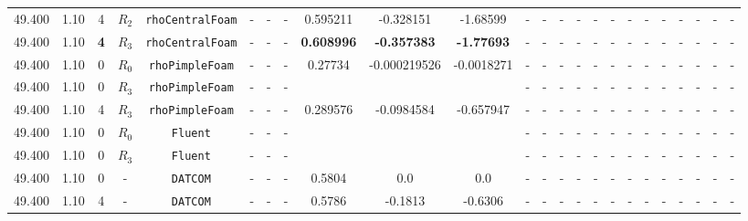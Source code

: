 \documentclass[12pt]{article}
\begin{document}
\begin{table}[H]
{\begin{tabular}{ccccc|ccc|ccc|ccc|ccc|ccccccc}
        \rowcolor{green!30}
        49.400 & 1.10 & 4 & $R_2$ & \texttt{rhoCentralFoam} & - & - & - & 0.595211 & -0.328151 & -1.68599 & - & - & - & - & - & - & - & - & - & - & - & - & - \\
        \rowcolor{green!40}
        49.400 & 1.10 & \cellcolor{lime}\textbf{4} & \cellcolor{cyan}$R_3$ & \texttt{rhoCentralFoam} & - & - & - & \textbf{0.608996} & \textbf{-0.357383} & \textbf{-1.77693} & - & - & - & - & - & - & - & - & - & - & - & - & - \\
        \rowcolor{blue!10}
        49.400 & 1.10 & 0 & $R_0$ & \texttt{rhoPimpleFoam} & - & - & - & 0.27734 & -0.000219526 & -0.0018271 & - & - & - & - & - & - & - & - & - & - & - & - & - \\ 
        \rowcolor{blue!40}
        49.400 & 1.10 & 0 & $R_3$ & \texttt{rhoPimpleFoam} & - & - & - &  & &  & - & - & - & - & - & - & - & - & - & - & - & - & - \\
        \rowcolor{blue!40}
        49.400 & 1.10 & 4 & $R_3$ & \texttt{rhoPimpleFoam} & - & - & - & 0.289576 & -0.0984584 & -0.657947 & - & - & - & - & - & - & - & - & - & - & - & - & - \\
        \rowcolor{red!10}
        49.400 & 1.10 & 0 & $R_0$ & \texttt{Fluent} & - & - & - &  &  &  & - & - & - & - & - & - & - & - & - & - & - & - & - \\ 
        \rowcolor{red!40}
        49.400 & 1.10 & 0 & $R_3$ & \texttt{Fluent} & - & - & - &  &  &  & - & - & - & - & - & - & - & - & - & - & - & - & - \\ 
        \rowcolor{gray!10}
        49.400 & 1.10 & 0 & - & \texttt{DATCOM} & - & - & - & 0.5804 & 0.0 & 0.0 & - & - & - & - & - & - & - & - & - & - & - & - & - \\ 
        \rowcolor{gray!10}
        49.400 & 1.10 & 4 & - & \texttt{DATCOM} & - & - & - & 0.5786 & -0.1813 & -0.6306 & - & - & - & - & - & - & - & - & - & - & - & - & - \\ \hline 

\end{tabular}}
\end{table}
\end{document}
